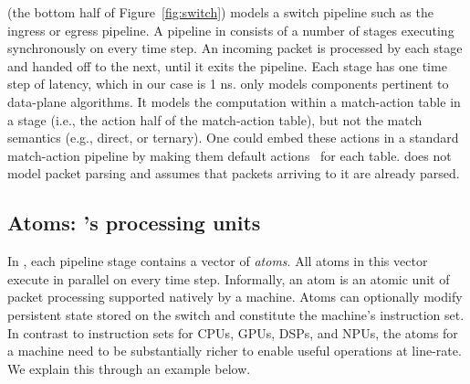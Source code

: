 \absmachine (the bottom half of Figure~\ref{fig:switch}) models a
switch pipeline such as the ingress or egress pipeline. A pipeline in
\absmachine consists of a number of stages executing synchronously on
every time step. An incoming packet is processed by each stage and
handed off to the next, until it exits the pipeline. Each stage has
one time step of latency, which in our case is 1 ns. \absmachine
only models components pertinent to data-plane algorithms.  It models
the computation within a match-action table in a stage (i.e., the
action half of the match-action table), but not the match semantics
(e.g., direct, or ternary). One could embed these actions in a
standard match-action pipeline by making them default
actions~\cite{p4spec} for each table.    \absmachine does not model packet parsing
and assumes that packets arriving to it are already parsed.

\subsection{Atoms: \absmachine's processing units}
\label{ss:atoms}

In \absmachine, each pipeline stage contains a vector of
\textit{atoms}. All atoms in this vector execute in parallel on every
time step.  Informally, an atom is an atomic unit of packet processing
supported natively by a \absmachine machine. Atoms can optionally
modify persistent state stored on the switch and constitute the
machine's instruction set.  In contrast to instruction sets for CPUs,
GPUs, DSPs, and NPUs, the atoms for a \absmachine machine need to be
substantially richer to enable useful operations at line-rate. We
explain this through an example below.


